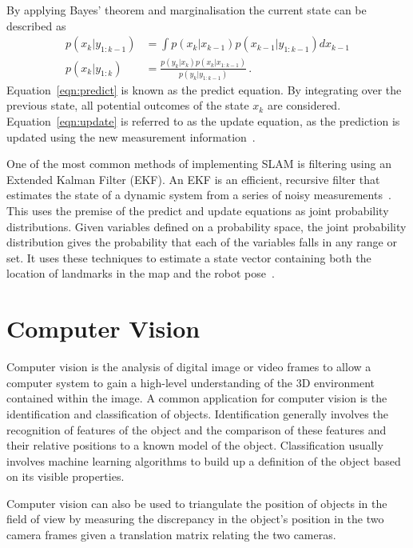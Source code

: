 By applying Bayes' theorem and marginalisation the current state can be described as
\begin{align}
\label{eqn:predict}
p(x_{k} | y_{1:k-1}) & = \int p(x_{k}|x_{k-1}) p(x_{k-1} | y_{1:k-1}) dx_{k-1} \\
\label{eqn:update}
p(x_{k} | y_{1:k}) &= \frac{ p(y_{k}|x_{k})p(x_{k}|x_{1:k-1})}{ p(y_{k}|y_{1:k-1})}\,.
\end{align}
Equation~\ref{eqn:predict} is known as the predict equation. By integrating over
the previous state, all potential outcomes of the state $x_k$ are
considered. Equation~\ref{eqn:update} is referred to as the update equation,
as the prediction is updated using the new measurement information~\cite{kam1997sensorfusion}.

One of the most common methods of implementing SLAM is filtering using an
Extended Kalman Filter (EKF). An EKF is an efficient, recursive filter
that estimates the state of a dynamic system from a series of noisy measurements~\cite{fox2003bayesian}.
This uses the premise of the predict and update equations as joint probability
distributions. Given variables defined on a probability space, the joint
probability distribution gives the probability that each of the variables falls in any
range or set. It uses these techniques to estimate a state vector containing
both the location of landmarks in the map and the robot pose~\cite{huang2007convergence}.


\section{Computer Vision}\label{litreview/cv}
Computer vision is the analysis of digital image or video frames to allow a computer
system to gain a high-level understanding of the 3D environment contained within
the image\cite{CVBallard}. A common application for computer vision is the identification and classification
of objects. Identification generally involves the recognition of features of the
object and the comparison of these features and their relative positions to a
known model of the object. Classification usually involves machine learning
algorithms to build up a definition of the object based on its visible properties\cite{CVpaoletti2018new}.

Computer vision can also be used to triangulate the position of objects in the
field of view by measuring the discrepancy in the object's position in the two camera
frames given a translation matrix relating the two cameras.

